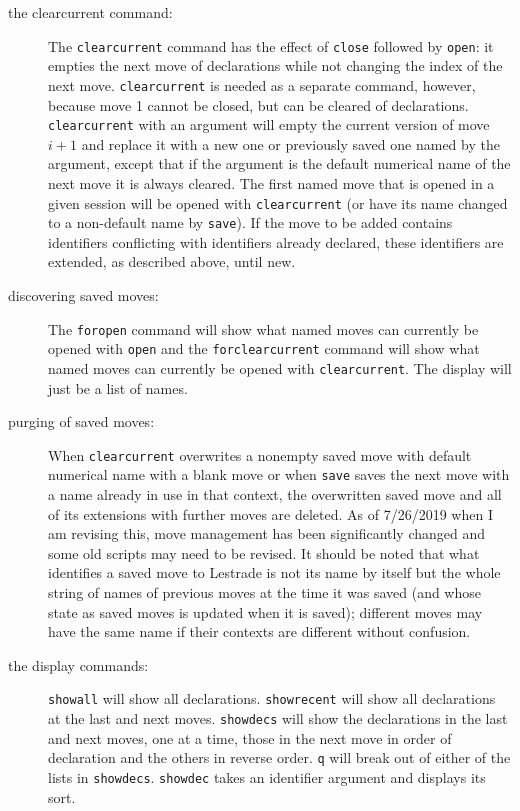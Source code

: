 \documentclass[12pt]{article}
\begin{document}
\begin{description}
\item[the clearcurrent command:]  The {\tt clearcurrent} command has the effect of {\tt close} followed by {\tt open}:  it empties the next move of declarations while not changing the index of the next move.  {\tt clearcurrent} is needed as a separate command, however, because move 1 cannot be closed, but can be cleared of declarations.  {\tt clearcurrent} with an argument will empty the current version of move $i+1$ and replace it with a new one or previously saved one named by the argument, except that if the argument is the default numerical name of the next move it is always cleared.    The first named move that is opened in a given session will be opened with {\tt clearcurrent} (or have its name changed to a non-default name by {\tt save}).  If the move to be added contains identifiers conflicting with identifiers already declared, these identifiers are extended, as described above, until new.

\item[discovering saved moves:]   The {\tt foropen} command will show what named moves can currently be opened with {\tt open}
and the {\tt forclearcurrent} command will show what named moves can currently be opened with {\tt clearcurrent}.  The display will just be a list of names.

\item[purging of saved moves:]  When {\tt clearcurrent} overwrites a nonempty saved move with default numerical name with a blank move or when {\tt save}
saves the next move with a name already in use in that context, the overwritten saved move and all of its extensions  with further moves are deleted.  As of 7/26/2019 when I am revising this, move management has been significantly changed and some old scripts may need to be revised.  It should be noted that what identifies a saved move to Lestrade is not its name by itself but the whole string of names of previous moves at the time it was saved (and whose state as saved moves is updated when it is saved);  different moves may have the same name if their contexts are different without confusion.

\item[the display commands:]  {\tt showall} will show all declarations.  {\tt showrecent} will show all declarations at the last and next moves.  {\tt showdecs}
will show the declarations in the last and next moves, one at a time, those in the next move in order of declaration and the others in reverse order.  {\tt q}
will break out of either of the lists in {\tt showdecs}.  {\tt showdec} takes an identifier argument and displays its sort. 


\end{description}
\end{document}
